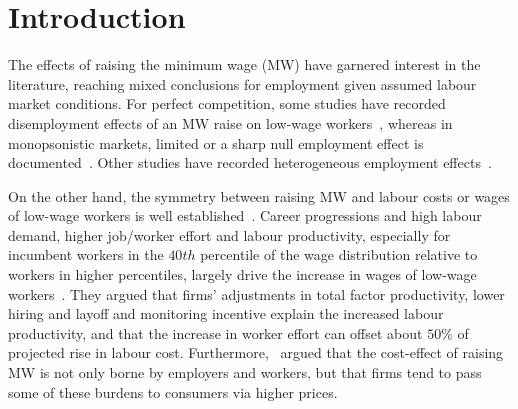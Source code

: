 \documentclass{C:/Users/david/OneDrive/Documents/ULMS/PhD/Thesis/chapter3/src/climate_change/latex/Economic_Journal/OUP-EJ}
\begin{document}
    \section{Introduction}\label{sec:introduction}
    The effects of raising the minimum wage (MW) have garnered interest in the literature, reaching mixed conclusions for employment given assumed labour market conditions. For perfect competition, some studies have recorded disemployment effects of an MW raise on low-wage workers~\citep{stigler1946economics, hamermesh1982minimum, neumark1992employment, brown1999minimum, machin2004minimum, neumark2000minimum, borjas2010labor}, whereas in monopsonistic markets, limited or a sharp null employment effect is documented~\citep{lester1960employment, card1993minimum, card2000minimum, aaronson2018industry, cengiz2019effect, wong2019minimum, dustmann2022reallocation}. Other studies have recorded heterogeneous employment effects~\citep{okudaira2019minimum, medrano2023minimum, meer2023effects, gregory2022minimum}.

    On the other hand, the symmetry between raising MW and labour costs or wages of low-wage workers is well established~\citep{medrano2023minimum,clemens2023important}. Career progressions and high labour demand, higher job/worker effort and labour productivity, especially for incumbent workers in the $40th$ percentile of the wage distribution relative to workers in higher percentiles, largely drive the increase in wages of low-wage workers~\citep{riley2017raising, kim2019minimum, wong2019minimum, baek2021impact, zhao2021effects, seok2022macroeconomic, ku2022does, coviello2022minimum, alexandre2022minimum}. They argued that firms' adjustments in total factor productivity, lower hiring and layoff and monitoring incentive explain the increased labour productivity, and that the increase in worker effort can offset about $50\%$ of projected rise in labour cost. Furthermore,~\citet{harasztosi2019pays} argued that the cost-effect of raising MW is not only borne by employers and workers, but that firms tend to pass some of these burdens to consumers via higher prices.
\end{document}
